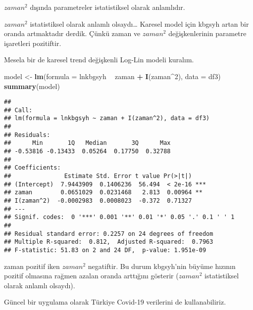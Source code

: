 \documentclass[
]{book}
\newenvironment{Shaded}{\begin{snugshade}}{\end{snugshade}}
\newcommand{\DataTypeTok}[1]{\textcolor[rgb]{0.13,0.29,0.53}{#1}}
\newcommand{\DecValTok}[1]{\textcolor[rgb]{0.00,0.00,0.81}{#1}}
\newcommand{\KeywordTok}[1]{\textcolor[rgb]{0.13,0.29,0.53}{\textbf{#1}}}
\newcommand{\NormalTok}[1]{#1}
\newcommand{\OperatorTok}[1]{\textcolor[rgb]{0.81,0.36,0.00}{\textbf{#1}}}
\newcommand{\StringTok}[1]{\textcolor[rgb]{0.31,0.60,0.02}{#1}}
\begin{document}
\(zaman^2\) dışında parametreler istatistiksel olarak anlamlıdır.

\(zaman^2\) istatistiksel olarak anlamlı olsaydı\ldots{} Karesel model için kbgsyh artan bir oranda artmaktadır derdik. Çünkü zaman ve \(zaman^2\) değişkenlerinin parametre işaretleri pozitiftir.

Mesela bir de karesel trend değişkenli Log-Lin modeli kuralım.

\begin{Shaded}
\begin{Highlighting}[]
\NormalTok{model <-}\StringTok{ }\KeywordTok{lm}\NormalTok{(}\DataTypeTok{formula =}\NormalTok{ lnkbgsyh }\OperatorTok{~}\StringTok{ }\NormalTok{zaman }\OperatorTok{+}\StringTok{ }\KeywordTok{I}\NormalTok{(zaman}\OperatorTok{^}\DecValTok{2}\NormalTok{), }\DataTypeTok{data =}\NormalTok{ df3)}
\KeywordTok{summary}\NormalTok{(model)}
\end{Highlighting}
\end{Shaded}

\begin{verbatim}
## 
## Call:
## lm(formula = lnkbgsyh ~ zaman + I(zaman^2), data = df3)
## 
## Residuals:
##      Min       1Q   Median       3Q      Max 
## -0.53816 -0.13433  0.05264  0.17750  0.32788 
## 
## Coefficients:
##               Estimate Std. Error t value Pr(>|t|)    
## (Intercept)  7.9443909  0.1406236  56.494  < 2e-16 ***
## zaman        0.0651029  0.0231468   2.813  0.00964 ** 
## I(zaman^2)  -0.0002983  0.0008023  -0.372  0.71327    
## ---
## Signif. codes:  0 '***' 0.001 '**' 0.01 '*' 0.05 '.' 0.1 ' ' 1
## 
## Residual standard error: 0.2257 on 24 degrees of freedom
## Multiple R-squared:  0.812,  Adjusted R-squared:  0.7963 
## F-statistic: 51.83 on 2 and 24 DF,  p-value: 1.951e-09
\end{verbatim}

zaman pozitif iken \(zaman^2\) negatiftir. Bu durum kbgsyh'nin büyüme hızının pozitif olmasına rağmen azalan oranda arttığını gösterir (\(zaman^2\) istatistiksel olarak anlamlı olsaydı).

Güncel bir uygulama olarak Türkiye Covid-19 verilerini de kullanabiliriz.
\end{document}
